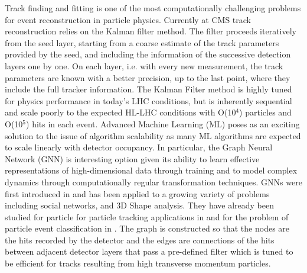 \documentclass[preprint,12pt]{elsarticle}
\begin{document}
Track finding and fitting is one of the most computationally challenging 
problems for event reconstruction in particle physics.
Currently at CMS track reconstruction relies on the Kalman filter method. 
The filter proceeds iteratively from the seed layer, starting from a coarse estimate of 
the track parameters provided by the seed, and including the
information of the successive detection layers one by one. 
On each layer, i.e. with every new measurement, the track parameters 
are known with a better precision, up to the last point, where they 
include the full tracker information.
The Kalman Filter method is highly tuned for physics performance in today’s LHC 
conditions, but is inherently sequential and scale poorly to the 
expected HL-LHC conditions with O(10$^{4}$) particles and O(10$^{5}$) hits 
in each event. %
Advanced Machine Learning (ML) poses as an exciting solution to the issue of 
algorithm scalability as many ML algorithms are expected to scale linearly %
with detector occupancy.
In particular, the Graph Neural Network (GNN) is interesting option
given its ability to learn effective representations of high-dimensional data 
through training and to model complex dynamics through computationally regular 
transformation techniques.
GNNs were first introduced in \cite{GNN_first}
and has been applied to a growing variety of problems including social networks,
and 3D Shape analysis. They have already been studied for particle for particle tracking
applications in \cite{GNN_particletracking1,GNN_particletracking2} and for the problem
of particle event classification in \cite{GNN_ec_1, GNN_ec_2, GNN_ec_3}.
The graph is constructed so that the nodes are the hits recorded by the detector and the 
edges are connections of the hits between adjacent detector layers that pass a pre-defined
filter which is tuned to be efficient for tracks resulting from high transverse momentum
particles. 

\end{document}
